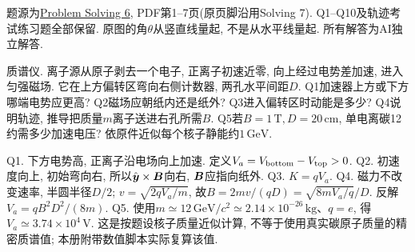 题源为\href{https://ocw.mit.edu/courses/8-02-physics-ii-electricity-and-magnetism-spring-2007/resources/solving06/}{Problem Solving 6}, PDF第1--7页(原页脚沿用Solving 7). Q1--Q10及轨迹考试练习题全部保留. 原图的角$\theta$从竖直线量起, 不是从水平线量起. 所有解答为AI独立解答.

\begin{exercise}
质谱仪. 离子源从原子剥去一个电子, 正离子初速近零, 向上经过电势差加速, 进入匀强磁场. 它在上方偏转区弯向右侧计数器, 两孔水平间距$D$.
Q1加速器上方或下方哪端电势应更高?
Q2磁场应朝纸内还是纸外?
Q3进入偏转区时动能是多少?
Q4说明轨迹, 推导把质量$m$离子送进右孔所需$B$.
Q5若$B=1\,\mathrm T,D=20\,\mathrm{cm}$, 单电离碳12约需多少加速电压? 依原件近似每个核子静能约$1\,\mathrm{GeV}$.
\end{exercise}
\begin{solution}
Q1. 下方电势高, 正离子沿电场向上加速. 定义$V_a=V_{\rm bottom}-V_{\rm top}>0$.
Q2. 初速度向上, 初始弯向右, 所以$\hat{\boldsymbol{y}}\times\boldsymbol{B}$向右, $\boldsymbol{B}$应指向纸外.
Q3. $K=qV_a$.
Q4. 磁力不改变速率, 半圆半径$D/2$; $v=\sqrt{2qV_a/m}$, 故$B=2mv/(qD)=\sqrt{8mV_a/q}/D$. 反解$V_a=qB^2D^2/(8m)$.
Q5. 使用$m\simeq12\,\mathrm{GeV}/c^2\simeq2.14\times10^{-26}\,\mathrm{kg}$、$q=e$, 得$V_a\simeq3.74\times10^4\,\mathrm V$. 这是按题设核子质量近似计算, 不等于使用真实碳原子质量的精密质谱值; 本册附带数值脚本实际复算该值.
\end{solution}

